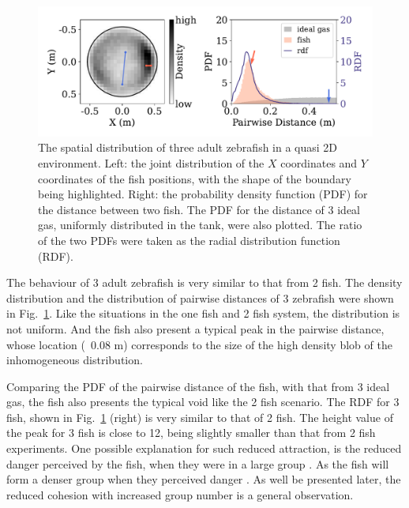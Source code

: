 \documentclass[11pt,twoside]{report}
\begin{document}
\begin{figure}
  \includegraphics[width=\linewidth]{dist-3-fish}
  \caption[The 2D spatial distribution of three fish]{The spatial distribution of three adult zebrafish in a quasi 2D environment. Left: the joint distribution of the $X$ coordinates and $Y$ coordinates of the fish positions, with the shape of the boundary being highlighted. Right: the probability density function (PDF) for the distance between two fish. The PDF for the distance of 3 ideal gas, uniformly distributed in the tank, were also plotted. The ratio of the two PDFs were taken as the radial distribution function (RDF).}
  \label{fig:density_2d_fish_3}
\end{figure}


The behaviour of 3 adult zebrafish is very similar to that from 2 fish. The density distribution and the distribution of pairwise distances of 3 zebrafish were shown in Fig.~\ref{fig:density_2d_fish_3}. Like the situations in the one fish and 2 fish system, the distribution is not uniform. And the fish also present a typical peak in the pairwise distance, whose location (~0.08 m) corresponds to the size of the high density blob of the inhomogeneous distribution.


Comparing the PDF of the pairwise distance of the fish, with that from 3 ideal gas, the fish also presents the typical void like the 2 fish scenario. The RDF for 3 fish, shown in Fig.~\ref{fig:density_2d_fish_3} (right) is very similar to that of 2 fish. The height value of the peak for 3 fish is close to 12, being slightly smaller than that from 2 fish experiments. One possible explanation for such reduced attraction, is the reduced danger perceived by the fish, when they were in a large group \cite{spence2007}.
As the fish will form a denser group when they perceived danger \cite{perez-escudero2017}.
 As well be presented later, the reduced cohesion with increased group number is a general observation.
\end{document}
